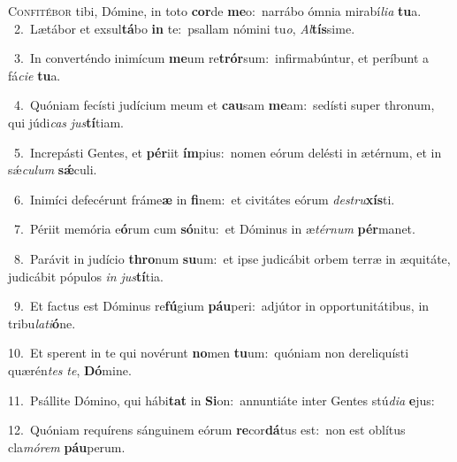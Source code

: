 \lettrine{\initial\textcolor{\initialcolor}{C}}{onfitébor} tibi, Dómine, in toto \textbf{cor}\-de \textbf{me}\-o:~\star narrábo ómnia mirabí\-\textit{li}\-\textit{a} \textbf{tu}\-a.\\
{\numbfont\textcolor{\numbcolor}{~2.}}~Lætábor et exsul\-\textbf{tá}\-bo \textbf{in} te:~\star psallam nómini tu\-\textit{o}\-, \textit{Al}\-\textbf{tís}sime.\par
{\numbfont\textcolor{\numbcolor}{~3.}}~In converténdo inimícum \textbf{me}\-um re\-\textbf{trór}\-sum:~\star infirmabúntur, et períbunt a fá\-\textit{ci}\-\textit{e} \textbf{tu}\-a.\par
{\numbfont\textcolor{\numbcolor}{~4.}}~Quóniam fecísti judícium meum et \textbf{cau}\-sam \textbf{me}\-am:~\star sedísti super thronum, qui júdi\textit{cas} \textit{jus}\-\textbf{tí}tiam.\par
{\numbfont\textcolor{\numbcolor}{~5.}}~Increpásti Gentes, et \textbf{pér}\-iit \textbf{ím}\-pius:~\star nomen eórum delésti in ætérnum, et in sǽ\-\textit{cu}\-\textit{lum} \textbf{sǽ}\-culi.\par
{\numbfont\textcolor{\numbcolor}{~6.}}~Inimíci defecérunt fráme\textbf{æ} in \textbf{fi}\-nem:~\star et civitátes eórum \textit{de}\-\textit{stru}\textbf{xís}ti.\par
{\numbfont\textcolor{\numbcolor}{~7.}}~Périit memória e\-\textbf{ó}\-rum cum \textbf{só}\-nitu:~\star et Dóminus in æ\-\textit{tér}\-\textit{num} \textbf{pér}\-manet.\par
{\numbfont\textcolor{\numbcolor}{~8.}}~Parávit in judício \textbf{thro}\-num \textbf{su}\-um:~\star et ipse judicábit orbem terræ in æquitáte, judicábit pópulos \textit{in} \textit{jus}\-\textbf{tí}tia.\par
{\numbfont\textcolor{\numbcolor}{~9.}}~Et factus est Dóminus re\-\textbf{fú}\-gium \textbf{páu}\-peri:~\star adjútor in opportunitátibus, in tribu\-\textit{la}\-\textit{ti}\textbf{ó}ne.\par
{\numbfont\textcolor{\numbcolor}{10.}}~Et sperent in te qui novérunt \textbf{no}\-men \textbf{tu}\-um:~\star quóniam non dereliquísti quærén\textit{tes} \textit{te}\-, \textbf{Dó}\-mine.\par
{\numbfont\textcolor{\numbcolor}{11.}}~Psállite Dómino, qui hábi\textbf{tat} in \textbf{Si}\-on:~\star annuntiáte inter Gentes stú\-\textit{di}\-\textit{a} \textbf{e}\-jus:\par
{\numbfont\textcolor{\numbcolor}{12.}}~Quóniam requírens sánguinem eórum \textbf{re}\-cor\-\textbf{dá}\-tus est:~\star non est oblítus cla\-\textit{mó}\-\textit{rem} \textbf{páu}\-perum.\par
